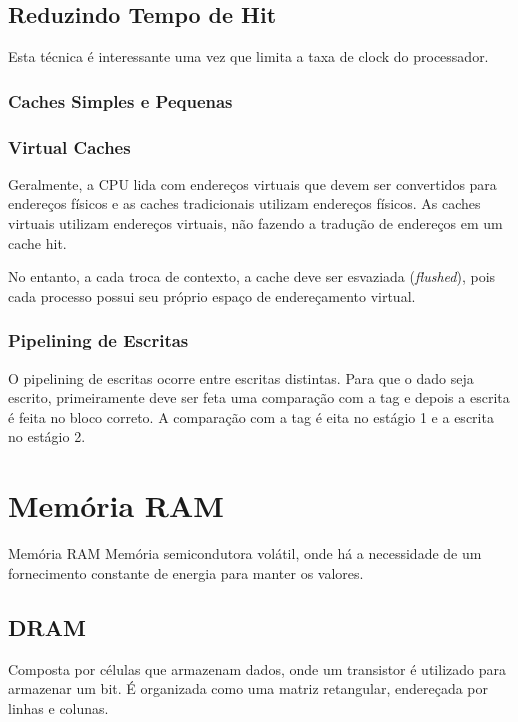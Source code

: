 \subsection{Reduzindo Tempo de Hit}
Esta técnica é interessante uma vez que limita a taxa de clock do processador.


\subsubsection{Caches Simples e Pequenas}




\subsubsection{Virtual Caches}
Geralmente, a CPU lida com endereços virtuais que devem ser convertidos para endereços físicos e as caches tradicionais utilizam endereços físicos. As caches virtuais utilizam endereços virtuais, não fazendo a tradução de endereços em um cache hit.

No entanto, a cada troca de contexto, a cache deve ser esvaziada (\textit{flushed}), pois cada processo possui seu próprio espaço de endereçamento virtual.



\subsubsection{Pipelining de Escritas}
O pipelining de escritas ocorre entre escritas distintas. Para que o dado seja escrito, primeiramente deve ser feta uma comparação com a tag e depois a escrita é feita no bloco correto. A comparação com a tag é eita no estágio 1 e a escrita no estágio 2.








\section{Memória RAM}
\begin{definicao}{Memória RAM}
  Memória semicondutora volátil, onde há a necessidade de um fornecimento constante de energia para manter os valores.
\end{definicao}

\subsection{DRAM}
Composta por células que armazenam dados, onde um transistor é utilizado para armazenar um bit. É organizada como uma matriz retangular, endereçada por linhas e colunas.


